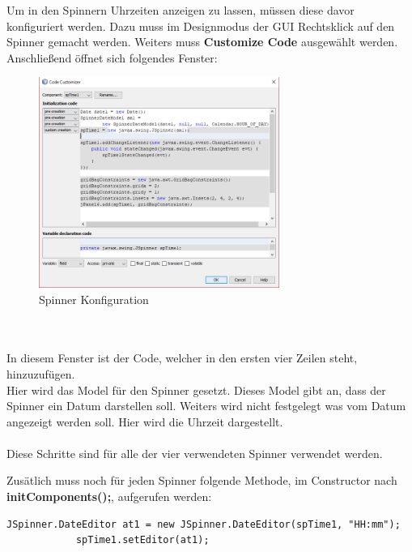 Um in den Spinnern Uhrzeiten anzeigen zu lassen, müssen diese davor konfiguriert werden. Dazu muss im Designmodus der GUI Rechtsklick auf den Spinner gemacht werden. Weiters muss \textbf{Customize Code} ausgewählt werden. Anschließend öffnet sich folgendes Fenster: \\
\begin{figure}
\vspace{-20pt}
  \begin{center}
    \includegraphics[width=0.70\textwidth]{Bilder/Java_Programm/SpinnerConfiguration}
  \end{center}
  \caption{Spinner Konfiguration}
  \label{SpinnerKonfiguration}
  \vspace{-70pt}
\end{figure}
\\ \\ In diesem Fenster ist der Code, welcher in den ersten vier Zeilen steht, hinzuzufügen. 
\\ Hier wird das Model für den Spinner gesetzt. Dieses Model gibt an, dass der Spinner ein Datum darstellen soll. Weiters wird nicht festgelegt was vom Datum angezeigt werden soll. Hier wird die Uhrzeit dargestellt. 
\\ \\ Diese Schritte sind für alle der vier verwendeten Spinner verwendet werden.

\vspace{60pt}

Zusätlich muss noch für jeden Spinner folgende Methode, im Constructor nach \textbf{initComponents();}, aufgerufen werden:
\begin{lstlisting}[style=Javastyle, caption=Spinner Zeitzone]
	JSpinner.DateEditor at1 = new JSpinner.DateEditor(spTime1, "HH:mm");
        	spTime1.setEditor(at1);
\end{lstlisting}


